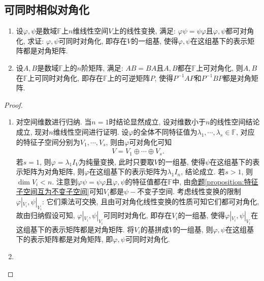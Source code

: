 \documentclass[../../main.tex]{subfiles}%
\begin{document}
\subsection{可同时相似对角化}

\begin{proposition}\label{proposition:乘法可交换诱导同时对角化}
\begin{enumerate}
\item 设\(\varphi,\psi\)是数域\(\mathbb{F}\)上\(n\)维线性空间\(V\)上的线性变换, 满足: \(\varphi\psi = \psi\varphi\)且\(\varphi,\psi\)都可对角化, 求证: \(\varphi,\psi\)可同时对角化, 即存在\(V\)的一组基, 使得\(\varphi,\psi\)在这组基下的表示矩阵都是对角矩阵.

\item 设\(A,B\)是数域\(\mathbb{F}\)上的\(n\)阶矩阵, 满足: \(AB = BA\)且\(A,B\)都在\(\mathbb{F}\)上可对角化, 则\(A,B\)在\(\mathbb{F}\)上可同时对角化, 即存在\(\mathbb{F}\)上的可逆矩阵\(P\), 使得\(P^{-1}AP\)和\(P^{-1}BP\)都是对角矩阵.
\end{enumerate}
\end{proposition}
\begin{proof}
\begin{enumerate}
\item 对空间维数进行归纳. 当\(n = 1\)时结论显然成立, 设对维数小于\(n\)的线性空间结论成立, 现对\(n\)维线性空间进行证明. 设\(\varphi\)的全体不同特征值为\(\lambda_{1},\cdots ,\lambda_{s} \in \mathbb{F}\), 对应的特征子空间分别为\(V_{1},\cdots ,V_{s}\), 则由\(\varphi\)可对角化可知
\begin{align*}
V = V_{1}\oplus\cdots\oplus V_{s}.
\end{align*}
若\(s = 1\), 则\(\varphi=\lambda_{1}I_{V}\)为纯量变换, 此时只要取\(V\)的一组基, 使得\(\psi\)在这组基下的表示矩阵为对角矩阵, 则\(\varphi\)在这组基下的表示矩阵为\(\lambda_{1}I_{n}\), 结论成立. 若\(s > 1\), 则\(\dim V_{i}< n\). 注意到\(\varphi\psi = \psi\varphi\)且\(\varphi,\psi\)的特征值都在\(\mathbb{F}\)中, 由\hyperref[proposition:特征子空间互为不变子空间]{命题\ref{proposition:特征子空间互为不变子空间}}可知\(V_{i}\)都是\(\psi -\)不变子空间. 考虑线性变换的限制\(\varphi|_{V_{i}},\psi|_{V_{i}}\): 它们乘法可交换, 且由可对角化线性变换的性质可知它们都可对角化, 故由归纳假设可知, \(\varphi|_{V_{i}},\psi|_{V_{i}}\)可同时对角化, 即存在\(V_{i}\)的一组基, 使得\(\varphi|_{V_{i}},\psi|_{V_{i}}\)在这组基下的表示矩阵都是对角矩阵. 将\(V_{i}\)的基拼成\(V\)的一组基, 则\(\varphi,\psi\)在这组基下的表示矩阵都是对角矩阵, 即\(\varphi,\psi\)可同时对角化.

\item 
\end{enumerate}

\end{proof}
\end{document}
